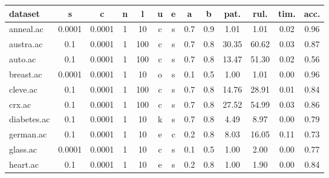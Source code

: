 \begin{table}[htbp]
	\centering
		\begin{tabular}{|l|c|c|c|c|c|c|c|c||c|c|c|c|}
		\hline
		\textbf{dataset}	& \textbf{s}	& \textbf{c}	& \textbf{n}	& \textbf{l}	& \textbf{u}	& \textbf{e} & \textbf{a} & \textbf{b} & \textbf{pat.}	& \textbf{rul.}	& \textbf{tim.}	& \textbf{acc.}	\\
		\hline
		anneal.ac      & 0.0001   & 0.0001      & 1              & 10       & c                   & s        & 0.7    & 0.9   & 1.01           & 1.01           & 0.02           & 0.96           \\
		\hline
		austra.ac      & 0.1      & 0.0001      & 1              & 100      & c                   & s        & 0.7    & 0.8   & 30.35          & 60.62          & 0.03           & 0.87           \\
		\hline
		auto.ac        & 0.1      & 0.0001      & 1              & 100      & c                   & s        & 0.7    & 0.8   & 13.47          & 51.30          & 0.02           & 0.56           \\
		\hline
		breast.ac      & 0.0001   & 0.0001      & 1              & 10       & o                   & s        & 0.1    & 0.5   & 1.00           & 1.01           & 0.00           & 0.96           \\
		\hline
		cleve.ac       & 0.1      & 0.0001      & 1              & 100      & c                   & s        & 0.7    & 0.8   & 14.76          & 28.91          & 0.01           & 0.84           \\
		\hline
		crx.ac         & 0.1      & 0.0001      & 1              & 100      & c                   & s        & 0.7    & 0.8   & 27.52          & 54.99          & 0.03           & 0.86           \\
		\hline
		diabetes.ac    & 0.1      & 0.0001      & 1              & 10       & k                   & s        & 0.7    & 0.8   & 4.49           & 8.97           & 0.00           & 0.79           \\
		\hline
		german.ac      & 0.1      & 0.0001      & 1              & 10       & e                   & c        & 0.2    & 0.8   & 8.03           & 16.05          & 0.11           & 0.73           \\
		\hline
		glass.ac       & 0.0001   & 0.0001      & 1              & 10       & c                   & s        & 0.1    & 0.5   & 1.00           & 2.00           & 0.00           & 0.77           \\
		\hline
		heart.ac       & 0.1      & 0.0001      & 1              & 10       & e                   & s        & 0.2    & 0.8   & 1.00           & 1.90           & 0.00           & 0.84           \\

\end{tabular}
\end{table}
